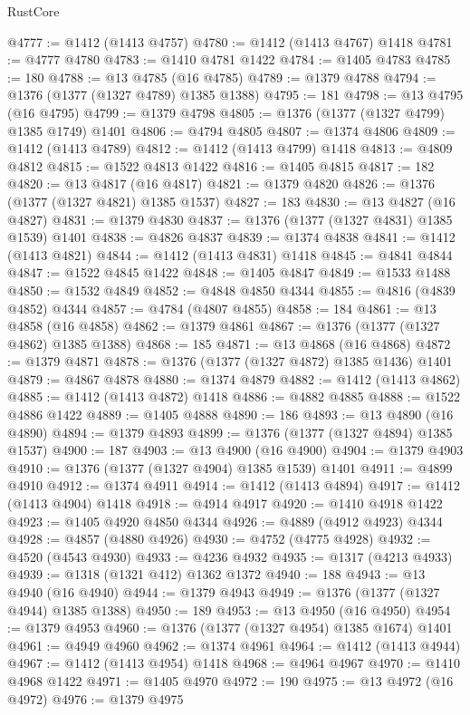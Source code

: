 \begin{lexlean}{RustCore}
\begin{coremodule}
@4777 := @1412 (@1413 @4757)
@4780 := @1412 (@1413 @4767) @1418
@4781 := @4777 @4780
@4783 := @1410 @4781 @1422
@4784 := @1405 @4783
@4785 := 180
@4788 := @13 @4785 (@16 @4785)
@4789 := @1379 @4788
@4794 := @1376 (@1377 (@1327 @4789) @1385 @1388)
@4795 := 181
@4798 := @13 @4795 (@16 @4795)
@4799 := @1379 @4798
@4805 := @1376 (@1377 (@1327 @4799) @1385 @1749) @1401
@4806 := @4794 @4805
@4807 := @1374 @4806
@4809 := @1412 (@1413 @4789)
@4812 := @1412 (@1413 @4799) @1418
@4813 := @4809 @4812
@4815 := @1522 @4813 @1422
@4816 := @1405 @4815
@4817 := 182
@4820 := @13 @4817 (@16 @4817)
@4821 := @1379 @4820
@4826 := @1376 (@1377 (@1327 @4821) @1385 @1537)
@4827 := 183
@4830 := @13 @4827 (@16 @4827)
@4831 := @1379 @4830
@4837 := @1376 (@1377 (@1327 @4831) @1385 @1539) @1401
@4838 := @4826 @4837
@4839 := @1374 @4838
@4841 := @1412 (@1413 @4821)
@4844 := @1412 (@1413 @4831) @1418
@4845 := @4841 @4844
@4847 := @1522 @4845 @1422
@4848 := @1405 @4847
@4849 := @1533 @1488
@4850 := @1532 @4849
@4852 := @4848 @4850 @4344
@4855 := @4816 (@4839 @4852) @4344
@4857 := @4784 (@4807 @4855)
@4858 := 184
@4861 := @13 @4858 (@16 @4858)
@4862 := @1379 @4861
@4867 := @1376 (@1377 (@1327 @4862) @1385 @1388)
@4868 := 185
@4871 := @13 @4868 (@16 @4868)
@4872 := @1379 @4871
@4878 := @1376 (@1377 (@1327 @4872) @1385 @1436) @1401
@4879 := @4867 @4878
@4880 := @1374 @4879
@4882 := @1412 (@1413 @4862)
@4885 := @1412 (@1413 @4872) @1418
@4886 := @4882 @4885
@4888 := @1522 @4886 @1422
@4889 := @1405 @4888
@4890 := 186
@4893 := @13 @4890 (@16 @4890)
@4894 := @1379 @4893
@4899 := @1376 (@1377 (@1327 @4894) @1385 @1537)
@4900 := 187
@4903 := @13 @4900 (@16 @4900)
@4904 := @1379 @4903
@4910 := @1376 (@1377 (@1327 @4904) @1385 @1539) @1401
@4911 := @4899 @4910
@4912 := @1374 @4911
@4914 := @1412 (@1413 @4894)
@4917 := @1412 (@1413 @4904) @1418
@4918 := @4914 @4917
@4920 := @1410 @4918 @1422
@4923 := @1405 @4920 @4850 @4344
@4926 := @4889 (@4912 @4923) @4344
@4928 := @4857 (@4880 @4926)
@4930 := @4752 (@4775 @4928)
@4932 := @4520 (@4543 @4930)
@4933 := @4236 @4932
@4935 := @1317 (@4213 @4933)
@4939 := @1318 (@1321 @412) @1362 @1372
@4940 := 188
@4943 := @13 @4940 (@16 @4940)
@4944 := @1379 @4943
@4949 := @1376 (@1377 (@1327 @4944) @1385 @1388)
@4950 := 189
@4953 := @13 @4950 (@16 @4950)
@4954 := @1379 @4953
@4960 := @1376 (@1377 (@1327 @4954) @1385 @1674) @1401
@4961 := @4949 @4960
@4962 := @1374 @4961
@4964 := @1412 (@1413 @4944)
@4967 := @1412 (@1413 @4954) @1418
@4968 := @4964 @4967
@4970 := @1410 @4968 @1422
@4971 := @1405 @4970
@4972 := 190
@4975 := @13 @4972 (@16 @4972)
@4976 := @1379 @4975

\end{coremodule}
\end{lexlean}
